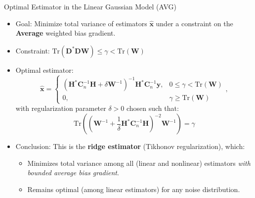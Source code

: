 \documentclass{beamer}
\begin{document}
\begin{frame}{Optimal Estimator in the Linear Gaussian Model (AVG)}
\begin{itemize}
    \item Goal: Minimize total variance of estimators \(\hat{\mathbf{x}}\) under a constraint on the \textbf{Average} weighted bias gradient.
    \item Constraint: \(\text{Tr}(\mathbf{D}^{*}\mathbf{D}\mathbf{W}) \leq \gamma < \text{Tr}(\mathbf{W})\)
    \item Optimal estimator:
    \[
    \hat{\mathbf{x}} =
    \begin{cases}
    \left( \mathbf{H}^{*}\mathbf{C}_{n}^{-1}\mathbf{H} + \delta \mathbf{W}^{-1} \right)^{-1} \mathbf{H}^{*}\mathbf{C}_{n}^{-1} \mathbf{y}, & 0 \le \gamma < \text{Tr}(\mathbf{W}) \\
    0, & \gamma \geq \text{Tr}(\mathbf{W})
    \end{cases},
    \]
    with regularization parameter \(\delta > 0\) chosen such that:
    \[
    \text{Tr}\left((\mathbf{W}^{-1} + \frac{1}{\delta}\mathbf{H}^{*}\mathbf{C}_{n}^{-1}\mathbf{H})^{-2} \mathbf{W}^{-1} \right) = \gamma
    \]
    \item Conclusion: This is the \textbf{ridge estimator} (Tikhonov regularization), which:
    \begin{itemize}
        \item Minimizes total variance among all (linear and nonlinear) estimators \textit{with bounded average bias gradient}.
        \item Remains optimal (among linear estimators) for any noise distribution.
    \end{itemize}
\end{itemize}
\end{frame}
\end{document}
